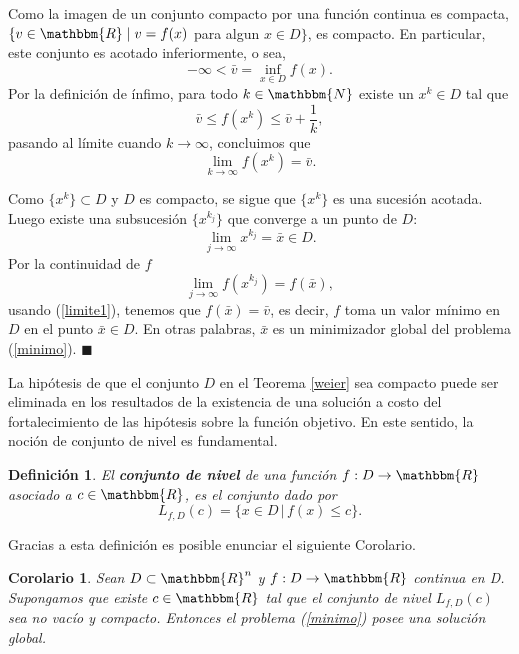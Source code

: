 \documentclass[a4paper,12pt]{report}
\newcommand{\RR}{\mathbbm{R}}
\newcommand{\NN}{\mathbbm{N}}
\newcommand{\Rn}{\RR^n}
\newcommand{\Lf}{L_{f,D}}
\newcommand{\bx}{\bar{x}}
\newcommand{\arr}{\rightarrow}
\newtheorem{cor}[teo]{Corolario}
\newtheorem{defi}[teo]{Definici\'on}
\newenvironment{dem}{\vspace*{-0.1cm}{\it Demostraci\'on:}}{\hfill
$\blacksquare$\\}
\begin{document}
\begin{dem}
Como la imagen de un conjunto compacto por una funci\'on continua es compacta, $\{ v \in \RR\mid v = f(x)$ \textrm{para algun} $x \in D \}$, es compacto. En particular, este conjunto es acotado inferiormente, o sea, $$-\infty < \bar{v} = \inf_{x\in D} f(x).$$ 
Por la definici\'on de \'infimo, para todo $k\in \NN$ existe un $x^k \in D$ tal que $$\bar{v} \leq f(x^k) \leq \bar{v} + \frac{1}{k},$$ pasando al l\'imite cuando $k \arr \infty $, concluimos que 
\begin{equation}\label{limite1}
\lim_{k \arr \infty} f(x^k) = \bar{v}.
\end{equation}

Como $\{ x^k \} \subset D$ y $D$ es compacto, se sigue que $\{ x^k \}$ es una sucesi\'on acotada. Luego existe una subsucesi\'on $\{ x^{k_j} \}$ que converge a un punto de $D$:
$$\lim_{j \arr \infty}x^{k_j} = \bx\in D.$$
Por la continuidad de $f$
$$\lim_{j \arr \infty}f(x^{k_j})=f(\bx),$$
usando (\ref{limite1}), tenemos que $f(\bx)=\bar{v}$, es decir, $f$ toma un valor m\'inimo en $D$ en el punto $\bx\in D$. En otras palabras, $\bx$ es un minimizador global del problema (\ref{minimo}).
\end{dem}


La hip\'otesis de que el conjunto $D$ en el Teorema \ref{weier} sea compacto puede ser eliminada en los resultados de la existencia de una soluci\'on a costo del fortalecimiento de las hip\'otesis sobre la funci\'on objetivo. En este sentido, la noci\'on de conjunto de nivel es fundamental.

\begin{defi}El \textbf{conjunto de nivel} de una funci\'on $f:D \arr \RR$ asociado a $c\in \RR$, es el conjunto dado por $$\Lf(c) = \{ x\in D\, | \, f(x)\leq c\}.$$ 
\end{defi}

Gracias a esta definici\'on es posible enunciar el siguiente Corolario.

\begin{cor}\label{cor:weier} Sean $D\subset \Rn$ y $f:D\arr \RR$ continua en D. Supongamos que existe $c\in \RR$ tal que el conjunto de nivel $\Lf(c)$ sea no vac\'io y compacto.
Entonces el problema (\ref{minimo}) posee una soluci\'on global.
\end{cor}
\end{document}
